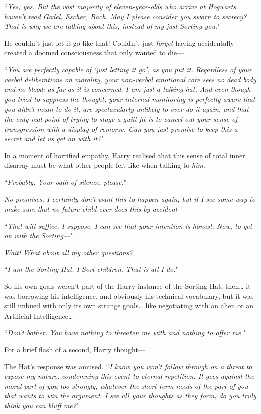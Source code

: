 ``\emph{Yes, yes. But the vast majority of eleven-year-olds who arrive at Hogwarts haven't read \emph{Gödel, Escher, Bach}. May I please consider you sworn to secrecy? That is \emph{why} we are talking about this, instead of my just Sorting you.}"

He couldn't just let it go like that! Couldn't just \emph{forget} having accidentally created a doomed consciousness that only wanted to die—

``\emph{You are perfectly capable of `just letting it go', as you put it. Regardless of your verbal deliberations on morality, your non-verbal emotional core sees no dead body and no blood; as far as it is concerned, I am just a talking hat. And even though you tried to suppress the thought, your internal monitoring is perfectly aware that you didn't mean to do it, are spectacularly unlikely to ever do it again, and that the only real point of trying to stage a guilt fit is to cancel out your sense of transgression with a display of remorse. Can you just promise to keep this a secret and let us get on with it?}"

In a moment of horrified empathy, Harry realised that this sense of total inner disarray must be what other people felt like when talking to \emph{him}.

``\emph{Probably. Your oath of silence, please.}"

\emph{No promises. I certainly don't want this to happen again, but if I see some way to make \emph{sure} that no future child ever does this by accident—}

``\emph{That will suffice, I suppose. I can see that your intention is honest. Now, to get on with the Sorting—}"

\emph{Wait! What about all my other questions?}

``\emph{I am the Sorting Hat. I Sort children. That is all I do.}"

So his own goals weren't part of the Harry-instance of the Sorting Hat, then{\ldots} it was borrowing his intelligence, and obviously his technical vocabulary, but it was still imbued with only its own strange goals{\ldots} like negotiating with an alien or an Artificial Intelligence{\ldots}

``\emph{Don't bother. You have nothing to threaten me with and nothing to offer me.}"

For a brief flash of a second, Harry thought—

The Hat's response was amused. ``\emph{I know you won't follow through on a threat to expose my nature, condemning this event to eternal repetition. It goes against the moral part of you too strongly, whatever the short-term needs of the part of you that wants to win the argument. I see all your thoughts as they form, do you truly think you can bluff me?}"


